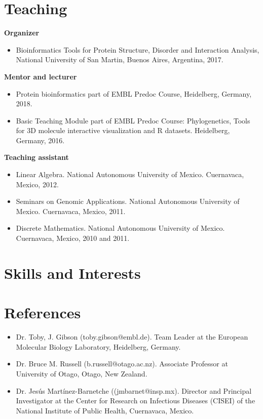 \documentclass[11pt,a4paper,sans]{moderncv} %
\begin{document}
\section{Teaching}
\vspace{-.1cm}
\textbf{Organizer}
\begin{itemize}
  \item Bioinformatics Tools for Protein Structure, Disorder and Interaction Analysis, National University of San Martin, Buenos Aires, Argentina, 2017.
\end{itemize}
\vspace{.1cm}
\textbf{Mentor and lecturer}
\begin{itemize}
  \item Protein bioinformatics part of EMBL Predoc Course, Heidelberg, Germany, 2018.
  \item Basic Teaching Module part of EMBL Predoc Course: Phylogenetics, Tools for 3D molecule interactive visualization and R datasets. Heidelberg, Germany, 2016.
\end{itemize}
\vspace{.1cm}
\textbf{Teaching assistant}
\begin{itemize}
  \item Linear Algebra. National Autonomous University of Mexico. Cuernavaca, Mexico, 2012.
  \item Seminars on Genomic Applications. National Autonomous University of Mexico. Cuernavaca, Mexico, 2011.
  \item Discrete Mathematics. National Autonomous University of Mexico. Cuernavaca, Mexico, 2010 and 2011.
\end{itemize}

\section{Skills and Interests}

\section{References}
\begin{itemize}
  \item Dr. Toby, J. Gibson (toby.gibson@embl.de).
  Team Leader at the European Molecular Biology Laboratory, Heidelberg, Germany.
  \item Dr. Bruce M. Russell (b.russell@otago.ac.nz).
  Associate Professor at University of Otago, Otago, New Zealand.
  \item Dr. Jes\'us Mart\'inez-Barnetche ((jmbarnet@insp.mx).
  Director and Principal Investigator at the Center for Research on Infectious Diseases (CISEI) of the National Institute of Public Health, Cuernavaca, Mexico.
\end{itemize}
\end{document}
